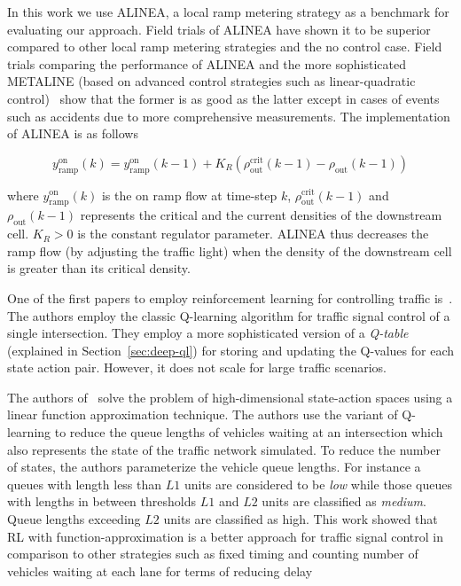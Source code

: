 \documentclass{sig-alternate-05-2015}
\begin{document}
In this work we use ALINEA, a local ramp metering strategy as a benchmark for evaluating our approach. Field trials of ALINEA have shown it to be superior compared to other local ramp metering strategies and the no control case. Field trials comparing the performance of ALINEA and the more sophisticated METALINE (based on advanced control strategies such as linear-quadratic control)~\cite{papageorgiou1997alinea} show that the former is as good as the latter except in cases of events such as accidents due to more comprehensive measurements. The implementation of ALINEA is as follows

\begin{equation}
\label{eq:alinea}
y^{\text{on}}_{\text{ramp}}(k)=y^{\text{on}}_{\text{ramp}}(k-1)+K_{R}(\rho_{\text{out}}^{\text{crit}}(k-1)-\rho_{\text{out}}(k-1))
\end{equation}

where $y^{\text{on}}_{\text{ramp}}(k)$ is the on ramp flow at time-step $k$, $\rho_{\text{out}}^{\text{crit}}(k-1)$ and $\rho_{\text{out}}(k-1)$ represents the critical and the current densities of the downstream cell. $K_{R}>0$ is the constant regulator parameter. ALINEA thus decreases the ramp flow (by adjusting the traffic light) when the density of the downstream cell is greater than its critical density.

One of the first papers to employ reinforcement learning for controlling traffic is~\cite{abdulhai2003reinforcement}. The authors employ the classic Q-learning algorithm for traffic signal control of a single intersection. They employ a more sophisticated version of a {\it Q-table} (explained in Section~\ref{sec:deep-ql}) for storing and updating the Q-values for each state action pair. However, it does not scale for large traffic scenarios. 

The authors of~\cite{prashanth2011reinforcement} solve the problem of high-dimensional state-action spaces using a linear function approximation technique. The authors use the variant of Q-learning  to reduce the queue lengths of vehicles waiting at an intersection  which also represents the state of the traffic network simulated. To reduce the number of states, the authors parameterize the vehicle queue lengths. For instance a queues with length less than $L1$ units are considered to be {\it low} while those queues with lengths in between thresholds $L1$ and $L2$ units are classified as {\it medium}. Queue lengths exceeding $L2$ units are classified as high. This work showed that RL with function-approximation is a better approach for traffic signal control in comparison to other strategies such as fixed timing and counting number of vehicles waiting at each lane for terms of reducing delay
\end{document}
